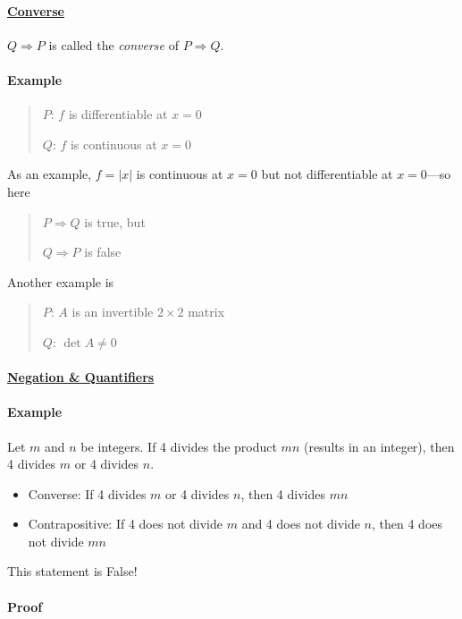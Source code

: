 \documentclass[../main.tex]{subfiles}
\begin{document}
\paragraph{\underline{Converse}}

$Q \Rightarrow P$ is called the \emph{converse} of $P \Rightarrow Q$.

\paragraph{Example}

\begin{quote}
    $P$: $f$ is differentiable at $x = 0$

    $Q$: $f$ is continuous at $x = 0$
\end{quote}

As an example, $f = |x|$ is continuous at $x = 0$ but not differentiable at $x = 0$---so here
\begin{quotation}
    $P \Rightarrow Q$ is true, but

    $Q \Rightarrow P$ is false
\end{quotation}
Another example is
\begin{quotation}
    $P$: $A$ is an invertible $2 \times 2$ matrix

    $Q$: $\det A \neq 0$
\end{quotation}

\newpage
\paragraph{\underline{Negation \& Quantifiers}}

\paragraph{Example}

Let $m$ and $n$ be integers. If 4 divides the product $mn$ (results in an integer),
then 4 divides $m$ or 4 divides $n$.

\begin{itemize}
    \item Converse: If 4 divides $m$ or 4 divides $n$, then 4 divides $mn$
    \item Contrapositive: If 4 does not divide $m$ and 4 does not divide $n$, then 4 does not divide $mn$
\end{itemize}

This statement is False!

\paragraph{Proof}
\end{document}
